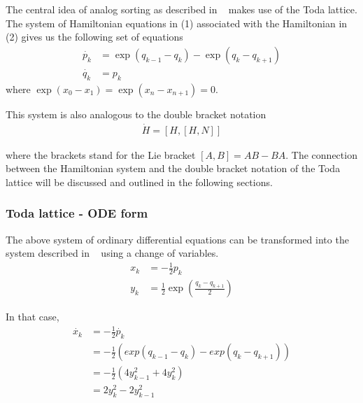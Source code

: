 

% 




The central idea of analog sorting as described in ~\cite{bloch, brockett} makes use of the Toda lattice. The system of Hamiltonian equations in (1) associated with the Hamiltonian in (2) gives us the following set of equations
\begin{align*}
\dot{p_k} &= \exp(q_{k-1}-q_{k})-\exp(q_{k}-q_{k+1}) \\
\dot{q_k} &= p_k
\end{align*}
where $\exp(x_0-x_1)=\exp (x_n-x_{n+1})=0$.

This system is also analogous to the double bracket notation 
\begin{align}
\dot{H} = [H,[H,N]]
\end{align}

where the brackets stand for the Lie bracket $[A,B] = AB-BA$. The connection between the Hamiltonian system  and the double bracket notation of the Toda lattice will be discussed and outlined in the following sections.

\subsubsection{Toda lattice - ODE form}

The above system of ordinary differential equations can be transformed into the system described in ~\cite{harvard_robo} using a change of variables.
\begin{align}
x_k &= -\frac{1}{2}p_k \nonumber \\
y_k &= \frac{1}{2}\exp(\frac{q_k-q_{k+1}}{2})
\end{align}

In that case, 
\begin{align*}
    \dot{x_k} &= -\frac{1}{2}\dot{p_k} \\
              &= -\frac{1}{2}(exp(q_{k-1}-q_{k})-exp(q_{k}-q_{k+1})) \\
              &= -\frac{1}{2}(4y^2_{k-1}+4y^2_k) \\
              &= 2y^2_k-2y^2_{k-1}
\end{align*}

